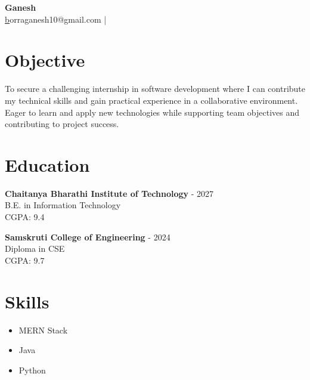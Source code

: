 \documentclass[a4paper,10pt]{article}
\begin{document}
\pagestyle{empty}

\begin{center}
    {\LARGE \textbf{ Ganesh }}\\
    \href{mailto: borraganesh10@gmail.com }borraganesh10@gmail.com \quad |  \\
\end{center}


    
\section*{Objective}
\noindent
To secure a challenging internship in software development where I can contribute my technical skills and gain practical experience in a collaborative environment. Eager to learn and apply new technologies while supporting team objectives and contributing to project success.
\vspace{0.3cm}


\section*{Education}

    \textbf{ Chaitanya Bharathi Institute of Technology }  - 2027 \\
    {  } B.E. in Information Technology \\
    {  }  CGPA: 9.4

    \textbf{ Samskruti College of Engineering }  - 2024 \\
    {  } Diploma in CSE \\
    {  }  CGPA: 9.7



\section*{Skills}
\begin{itemize}[leftmargin=*]
  
    \item MERN Stack 
  
    \item Java 
  
    \item Python
  
\end{itemize}


\end{document}
